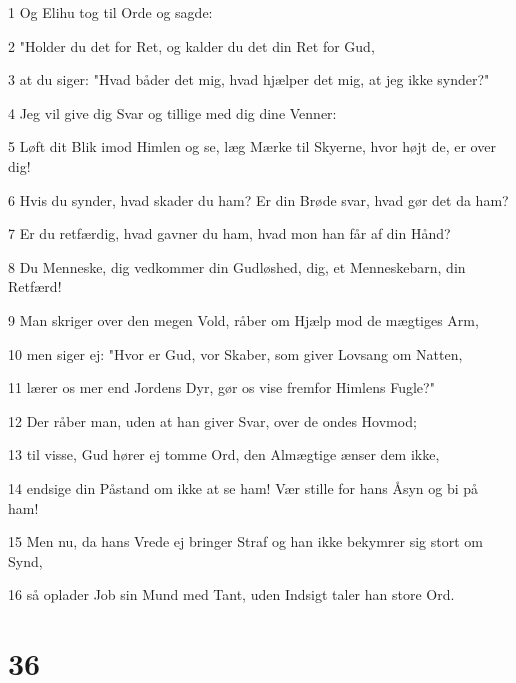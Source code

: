 \par 1 Og Elihu tog til Orde og sagde:
\par 2 "Holder du det for Ret, og kalder du det din Ret for Gud,
\par 3 at du siger: "Hvad båder det mig, hvad hjælper det mig, at jeg ikke synder?"
\par 4 Jeg vil give dig Svar og tillige med dig dine Venner:
\par 5 Løft dit Blik imod Himlen og se, læg Mærke til Skyerne, hvor højt de, er over dig!
\par 6 Hvis du synder, hvad skader du ham? Er din Brøde svar, hvad gør det da ham?
\par 7 Er du retfærdig, hvad gavner du ham, hvad mon han får af din Hånd?
\par 8 Du Menneske, dig vedkommer din Gudløshed, dig, et Menneskebarn, din Retfærd!
\par 9 Man skriger over den megen Vold, råber om Hjælp mod de mægtiges Arm,
\par 10 men siger ej: "Hvor er Gud, vor Skaber, som giver Lovsang om Natten,
\par 11 lærer os mer end Jordens Dyr, gør os vise fremfor Himlens Fugle?"
\par 12 Der råber man, uden at han giver Svar, over de ondes Hovmod;
\par 13 til visse, Gud hører ej tomme Ord, den Almægtige ænser dem ikke,
\par 14 endsige din Påstand om ikke at se ham! Vær stille for hans Åsyn og bi på ham!
\par 15 Men nu, da hans Vrede ej bringer Straf og han ikke bekymrer sig stort om Synd,
\par 16 så oplader Job sin Mund med Tant, uden Indsigt taler han store Ord.

\chapter{36}

